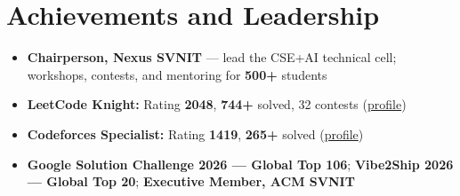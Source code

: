\documentclass[a4paper,10pt]{article}
\begin{document}
\section{Achievements and Leadership}
\small
\begin{itemize}
  \item \textbf{Chairperson, Nexus SVNIT} --- lead the CSE+AI technical cell; workshops, contests, and mentoring for \textbf{500+} students
  \item \textbf{LeetCode Knight:} Rating \textbf{2048}, \textbf{744+} solved, 32 contests (\href{https://leetcode.com/Oju_Srivastava}{profile})
  \item \textbf{Codeforces Specialist:} Rating \textbf{1419}, \textbf{265+} solved (\href{https://codeforces.com/profile/Oju}{profile})
  \item \textbf{Google Solution Challenge 2026 --- Global Top 106}; \textbf{Vibe2Ship 2026 --- Global Top 20}; \textbf{Executive Member, ACM SVNIT}
\end{itemize}
\end{document}
